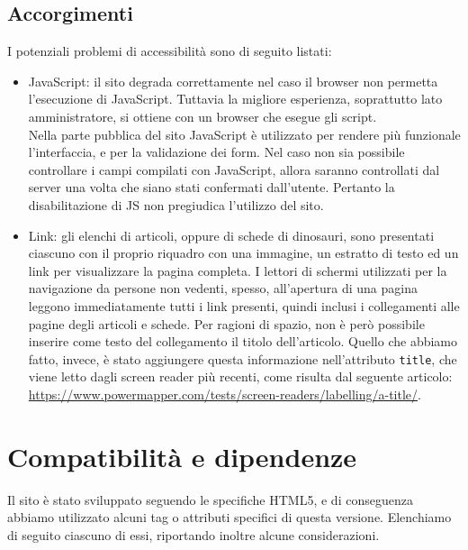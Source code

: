 \documentclass[12pt]{article}
\newcommand{\code}[1]{\texttt{#1}}
\begin{document}
	\subsection{Accorgimenti}
	I potenziali problemi di accessibilità sono di seguito listati:
	\begin{itemize}
		\item JavaScript: il sito degrada correttamente nel caso il browser non permetta l'esecuzione di JavaScript. Tuttavia la migliore esperienza, soprattutto lato amministratore, si ottiene con un browser che esegue gli script. \\
		Nella parte pubblica del sito JavaScript è utilizzato per rendere più funzionale l'interfaccia, e per la validazione dei form. Nel caso non sia possibile controllare i campi compilati con JavaScript, allora saranno controllati dal server una volta che siano stati confermati dall'utente. Pertanto la disabilitazione di JS non pregiudica l'utilizzo del sito.
		\item Link: gli elenchi di articoli, oppure di schede di dinosauri, sono presentati ciascuno con il proprio riquadro con una immagine, un estratto di testo ed un link per visualizzare la pagina completa. I lettori di schermi utilizzati per la navigazione da persone non vedenti, spesso, all'apertura di una pagina leggono immediatamente tutti i link presenti, quindi inclusi i collegamenti alle pagine degli articoli e schede.
		Per ragioni di spazio, non è però possibile inserire come testo del collegamento il titolo dell'articolo. Quello che abbiamo fatto, invece, è stato aggiungere questa informazione nell'attributo \code{title}, che viene letto dagli screen reader più recenti, come risulta dal seguente articolo: \url{https://www.powermapper.com/tests/screen-readers/labelling/a-title/}.
	\end{itemize}
	
	\section{Compatibilità e dipendenze}
	Il sito è stato sviluppato seguendo le specifiche HTML5, e di conseguenza abbiamo utilizzato alcuni tag o attributi specifici di questa versione. Elenchiamo di seguito ciascuno di essi, riportando inoltre alcune considerazioni.
\end{document}
